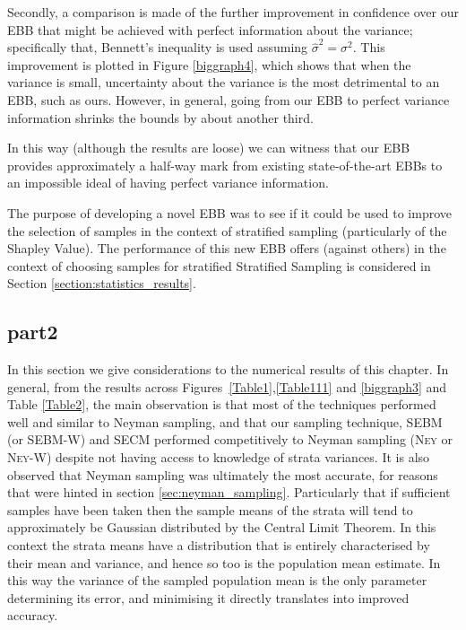 


Secondly, a comparison is made of the further improvement in confidence over our EBB that might be achieved with perfect information about the variance; specifically that, Bennett's inequality is used assuming $\hat{\sigma}^2=\sigma^2$. 
This improvement is plotted in Figure \ref{biggraph4}, which shows that when the variance is small, uncertainty about the variance is the most detrimental to an EBB, such as ours.
However, in general, going from our EBB to perfect variance information shrinks the bounds by about another third.

In this way (although the results are loose) we can witness that our EBB provides approximately a half-way mark from existing state-of-the-art EBBs to an impossible ideal of having perfect variance information.

The purpose of developing a novel EBB was to see if it could be used to improve the selection of samples in the context of stratified sampling (particularly of the Shapley Value).
The performance of this new EBB offers (against others) in the context of choosing samples for stratified Stratified Sampling is considered in Section \ref{section:statistics_results}.







\subsection{part2}




In this section we give considerations to the numerical results of this chapter.
In general, from the results across Figures~\ref{Table1},\ref{Table111} and \ref{biggraph3} and Table \ref{Table2}, the main observation is that most of the techniques performed well and similar to Neyman sampling, and that our sampling technique, SEBM (or SEBM-W) and SECM performed competitively to Neyman sampling (\textsc{Ney} or \textsc{Ney-W}) despite not having access to knowledge of strata variances.
It is also observed that Neyman sampling was ultimately the most accurate, for reasons that were hinted in section \ref{sec:neyman_sampling}.
Particularly that if sufficient samples have been taken then the sample means of the strata will tend to approximately be Gaussian distributed by the Central Limit Theorem.
In this context the strata means have a distribution that is entirely characterised by their mean and variance, and hence so too is the population mean estimate.
In this way the variance of the sampled population mean is the only parameter determining its error, and minimising it directly translates into improved accuracy.

